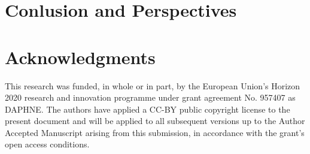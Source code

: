 \documentclass[conference,10pt]{IEEEtran}
\begin{document}
\section{Conlusion and Perspectives}

\section*{Acknowledgments}

This research was funded, in whole or in part, by the European Union’s Horizon 2020 research and innovation programme under grant agreement No. 957407 as DAPHNE.
The authors have applied a CC-BY public copyright license to the present document and will be applied to all subsequent versions up to the Author Accepted Manuscript arising from this submission, in accordance with the grant’s open access conditions.

\printbibliography
\end{document}
